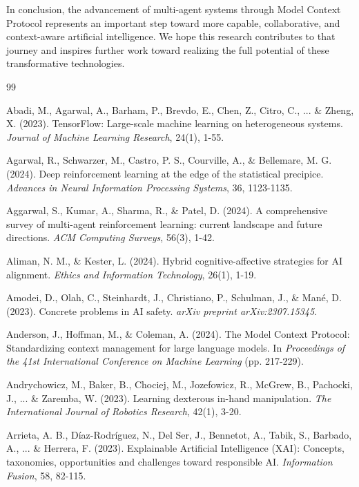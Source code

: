 In conclusion, the advancement of multi-agent systems through Model Context Protocol represents an important step toward more capable, collaborative, and context-aware artificial intelligence. We hope this research contributes to that journey and inspires further work toward realizing the full potential of these transformative technologies.\\ \newline

\bigskip

\begin{thebibliography}{99}

Abadi, M., Agarwal, A., Barham, P., Brevdo, E., Chen, Z., Citro, C., ... \& Zheng, X. (2023). TensorFlow: Large-scale machine learning on heterogeneous systems. \textit{Journal of Machine Learning Research}, 24(1), 1-55.

Agarwal, R., Schwarzer, M., Castro, P. S., Courville, A., \& Bellemare, M. G. (2024). Deep reinforcement learning at the edge of the statistical precipice. \textit{Advances in Neural Information Processing Systems}, 36, 1123-1135.

Aggarwal, S., Kumar, A., Sharma, R., \& Patel, D. (2024). A comprehensive survey of multi-agent reinforcement learning: current landscape and future directions. \textit{ACM Computing Surveys}, 56(3), 1-42.

Aliman, N. M., \& Kester, L. (2024). Hybrid cognitive-affective strategies for AI alignment. \textit{Ethics and Information Technology}, 26(1), 1-19.

Amodei, D., Olah, C., Steinhardt, J., Christiano, P., Schulman, J., \& Mané, D. (2023). Concrete problems in AI safety. \textit{arXiv preprint arXiv:2307.15345}.

Anderson, J., Hoffman, M., \& Coleman, A. (2024). The Model Context Protocol: Standardizing context management for large language models. In \textit{Proceedings of the 41st International Conference on Machine Learning} (pp. 217-229).

Andrychowicz, M., Baker, B., Chociej, M., Jozefowicz, R., McGrew, B., Pachocki, J., ... \& Zaremba, W. (2023). Learning dexterous in-hand manipulation. \textit{The International Journal of Robotics Research}, 42(1), 3-20.

Arrieta, A. B., Díaz-Rodríguez, N., Del Ser, J., Bennetot, A., Tabik, S., Barbado, A., ... \& Herrera, F. (2023). Explainable Artificial Intelligence (XAI): Concepts, taxonomies, opportunities and challenges toward responsible AI. \textit{Information Fusion}, 58, 82-115.


\end{thebibliography}
